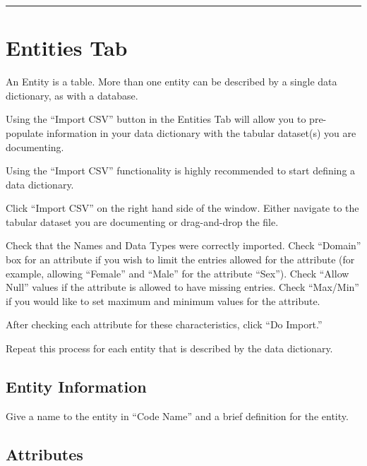 \documentclass[
]{book}
\makeatletter
\newenvironment{kframe}{%
\medskip{}
\setlength{\fboxsep}{.8em}
 \def\at@end@of@kframe{}%
 \ifinner\ifhmode%
  \def\at@end@of@kframe{\end{minipage}}%
  \begin{minipage}{\columnwidth}%
 \fi\fi%
 \def\FrameCommand##1{\hskip\@totalleftmargin \hskip-\fboxsep
 \colorbox{shadecolor}{##1}\hskip-\fboxsep
     \hskip-\linewidth \hskip-\@totalleftmargin \hskip\columnwidth}%
 \MakeFramed {\advance\hsize-\width
   \@totalleftmargin\z@ \linewidth\hsize
   \@setminipage}}%
 {\par\unskip\endMakeFramed%
 \at@end@of@kframe}
\newenvironment{rmdblock}[1]
  {
  \begin{itemize}
  \renewcommand{\labelitemi}{
    \raisebox{-.7\height}[0pt][0pt]{
      {\setkeys{Gin}{width=3em,keepaspectratio}\texttt{[image: images/\#1]}}
    }
  }
  \setlength{\fboxsep}{1em}
  \begin{kframe}
  \item
  }
  {
  \end{kframe}
  \end{itemize}
  }
\newenvironment{rmdtip}
  {\begin{rmdblock}{tip}}
  {\end{rmdblock}}
\makeatother
\begin{document}
\begin{center}\rule{0.5\linewidth}{\linethickness}\end{center}

\hypertarget{entities-tab}{%
\section*{Entities Tab}\label{entities-tab}}

An Entity is a table. More than one entity can be described by a single data dictionary, as with a database.

Using the ``Import CSV'' button in the Entities Tab will allow you to pre-populate information in your data dictionary with the tabular dataset(s) you are documenting.

\begin{rmdtip}
Using the ``Import CSV'' functionality is highly recommended to start
defining a data dictionary.
\end{rmdtip}

Click ``Import CSV'' on the right hand side of the window. Either navigate to the tabular dataset you are documenting or drag-and-drop the file.

Check that the Names and Data Types were correctly imported. Check ``Domain'' box for an attribute if you wish to limit the entries allowed for the attribute (for example, allowing ``Female'' and ``Male'' for the attribute ``Sex''). Check ``Allow Null'' values if the attribute is allowed to have missing entries. Check ``Max/Min'' if you would like to set maximum and minimum values for the attribute.

After checking each attribute for these characteristics, click ``Do Import.''

Repeat this process for each entity that is described by the data dictionary.

\hypertarget{entity-information}{%
\subsection*{Entity Information}\label{entity-information}}

Give a name to the entity in ``Code Name'' and a brief definition for the entity.

\hypertarget{attributes}{%
\subsection*{Attributes}\label{attributes}}
\end{document}
